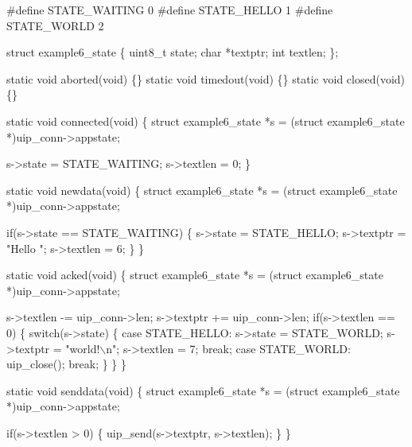 \begin{DoxyCode}
\textcolor{preprocessor}{#define STATE\_WAITING 0}
\textcolor{preprocessor}{#define STATE\_HELLO   1}
\textcolor{preprocessor}{#define STATE\_WORLD   2}

\textcolor{keyword}{struct }example6\_state \{
  uint8\_t state;
  \textcolor{keywordtype}{char} *textptr;
  \textcolor{keywordtype}{int}  textlen;
\};

\textcolor{keyword}{static} \textcolor{keywordtype}{void} aborted(\textcolor{keywordtype}{void}) \{\}
\textcolor{keyword}{static} \textcolor{keywordtype}{void} timedout(\textcolor{keywordtype}{void}) \{\}
\textcolor{keyword}{static} \textcolor{keywordtype}{void} closed(\textcolor{keywordtype}{void}) \{\}

\textcolor{keyword}{static} \textcolor{keywordtype}{void} connected(\textcolor{keywordtype}{void}) \{
  \textcolor{keyword}{struct }example6\_state *s = (\textcolor{keyword}{struct }example6\_state *)uip\_conn->appstate;

  s->state   = STATE\_WAITING;
  s->textlen = 0;
\}

\textcolor{keyword}{static} \textcolor{keywordtype}{void} newdata(\textcolor{keywordtype}{void}) \{
  \textcolor{keyword}{struct }example6\_state *s = (\textcolor{keyword}{struct }example6\_state *)uip\_conn->appstate;

  \textcolor{keywordflow}{if}(s->state == STATE\_WAITING) \{
    s->state   = STATE\_HELLO;
    s->textptr = \textcolor{stringliteral}{"Hello "};
    s->textlen = 6;
  \}
\}

\textcolor{keyword}{static} \textcolor{keywordtype}{void} acked(\textcolor{keywordtype}{void}) \{
  \textcolor{keyword}{struct }example6\_state *s = (\textcolor{keyword}{struct }example6\_state *)uip\_conn->appstate;
  
  s->textlen -= uip\_conn->len;
  s->textptr += uip\_conn->len;
  \textcolor{keywordflow}{if}(s->textlen == 0) \{
    \textcolor{keywordflow}{switch}(s->state) \{
    \textcolor{keywordflow}{case} STATE\_HELLO:
      s->state   = STATE\_WORLD;
      s->textptr = \textcolor{stringliteral}{"world!\(\backslash\)n"};
      s->textlen = 7;
      \textcolor{keywordflow}{break};
    \textcolor{keywordflow}{case} STATE\_WORLD:
      uip\_close();
      \textcolor{keywordflow}{break};
    \}
  \}
\}

\textcolor{keyword}{static} \textcolor{keywordtype}{void} senddata(\textcolor{keywordtype}{void}) \{
  \textcolor{keyword}{struct }example6\_state *s = (\textcolor{keyword}{struct }example6\_state *)uip\_conn->appstate;

  \textcolor{keywordflow}{if}(s->textlen > 0) \{
    uip\_send(s->textptr, s->textlen);
  \}
\}
\end{DoxyCode}


